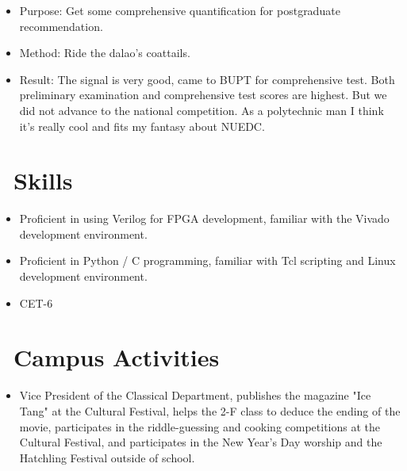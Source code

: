 \documentclass{resume}
\begin{document}
\begin{itemize}
  \item Purpose: Get some comprehensive quantification for postgraduate recommendation.
  \item Method: Ride the dalao's coattails.
  \item Result: The signal is very good, came to BUPT for comprehensive test. Both preliminary examination and comprehensive test scores are highest. But we did not advance to the national competition. As a polytechnic man I think it's really cool and fits my fantasy about NUEDC.
\end{itemize}

\section{\faCogs\ Skills}
\begin{itemize}[parsep=0.5ex]
  \item Proficient in using Verilog for FPGA development, familiar with the Vivado development environment.
  \item Proficient in Python / C programming, familiar with Tcl scripting and Linux development environment.
  \item CET-6
\end{itemize}

\section{\faInfo\ Campus Activities}
\begin{itemize}[parsep=0.5ex]
  \item Vice President of the Classical Department, publishes the magazine "Ice Tang" at the Cultural Festival, helps the 2-F class to deduce the ending of the movie, participates in the riddle-guessing and cooking competitions at the Cultural Festival, and participates in the New Year's Day worship and the Hatchling Festival outside of school.
\end{itemize}
\end{document}

